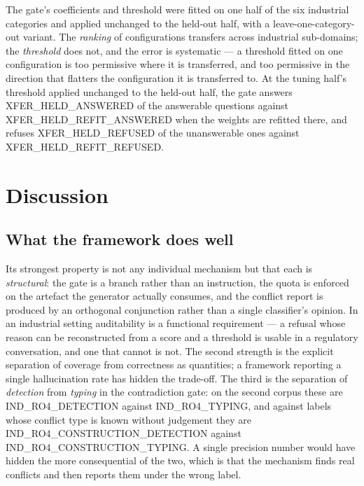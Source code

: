 \documentclass[preprint,3p,times]{elsarticle}
\begin{document}
The gate's coefficients and threshold were fitted on one half of the six
industrial categories and applied unchanged to the held-out half, with a
leave-one-category-out variant. The \emph{ranking} of configurations transfers
across industrial sub-domains; the \emph{threshold} does not, and the error is
systematic --- a threshold fitted on one configuration is too permissive where
it is transferred, and too permissive in the direction that flatters the
configuration it is transferred to. At the tuning half's threshold applied
unchanged to the held-out half, the gate answers
{{XFER_HELD_ANSWERED}} of the answerable questions against
{{XFER_HELD_REFIT_ANSWERED}} when the weights are refitted there, and refuses
{{XFER_HELD_REFUSED}} of the unanswerable ones against
{{XFER_HELD_REFIT_REFUSED}}.


\section{Discussion}

\subsection{What the framework does well}

Its strongest property is not any individual mechanism but that each is
\emph{structural}: the gate is a branch rather than an instruction, the quota is
enforced on the artefact the generator actually consumes, and the conflict
report is produced by an orthogonal conjunction rather than a single
classifier's opinion. In an industrial setting auditability is a functional
requirement --- a refusal whose reason can be reconstructed from a score and a
threshold is usable in a regulatory conversation, and one that cannot is not.
The second strength is the explicit separation of coverage from correctness as
quantities; a framework reporting a single hallucination rate has hidden the
trade-off. The third is the separation of \emph{detection} from \emph{typing}
in the contradiction gate: on the second corpus these are {{IND_RO4_DETECTION}}
against {{IND_RO4_TYPING}}, and against labels whose conflict type is known
without judgement they are {{IND_RO4_CONSTRUCTION_DETECTION}} against
{{IND_RO4_CONSTRUCTION_TYPING}}. A single precision number would have hidden
the more consequential of the two, which is that the mechanism finds real
conflicts and then reports them under the wrong label.
\end{document}
